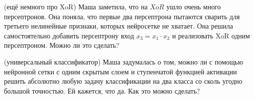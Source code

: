 \documentclass[12pt, a4paper, oneside]{article}
\theoremstyle{plain} %
\theoremstyle{definition}
\begin{document}
\begin{problem}{(ещё немного про XoR)} 
	Маша заметила, что на $XoR$ ушло очень много персептронов. Она поняла, что первые два персептрона пытаются сварить для третьего нелинейные признаки, которых нейросетке не хватает. Она решила самостоятельно добавить персептрону вход $x_3 = x_1 \cdot x_2$ и реализовать XoR одним персептроном. Можно ли это сделать? 
\end{problem}


\begin{problem}{(универсальный классификатор)}
	Маша задумалась о том, можно ли с помощью нейронной сетки с одним скрытым слоем и ступенчатой функцией активации решить абсолютно любую задачу классификации на два класса со сколь угодно большой точностью. Ей кажется, что да. Как это можно сделать? 
\end{problem} 
\end{document}
